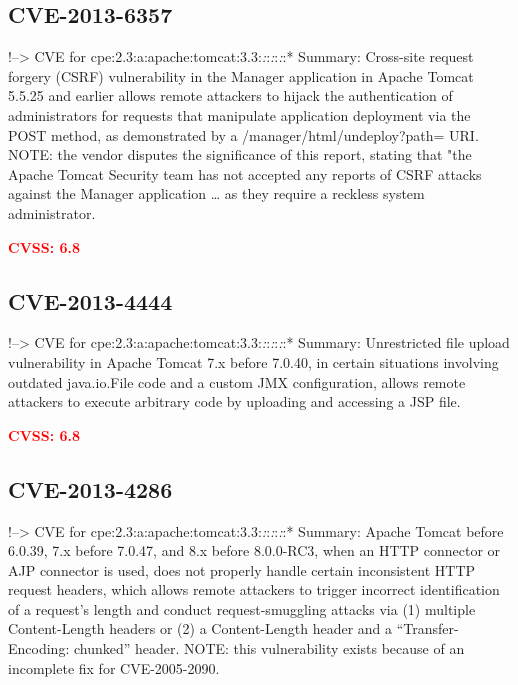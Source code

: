 \documentclass[a4paper, 12pt]{article}
\begin{document}
\hypertarget{cve-2013-6357}{%
\subsection{CVE-2013-6357}\label{cve-2013-6357}}

!--\textgreater{} CVE for
cpe:2.3:a:apache:tomcat:3.3:\emph{:}:\emph{:}:\emph{:}:* Summary:
Cross-site request forgery (CSRF) vulnerability in the Manager
application in Apache Tomcat 5.5.25 and earlier allows remote attackers
to hijack the authentication of administrators for requests that
manipulate application deployment via the POST method, as demonstrated
by a /manager/html/undeploy?path= URI. NOTE: the vendor disputes the
significance of this report, stating that "the Apache Tomcat Security
team has not accepted any reports of CSRF attacks against the Manager
application \ldots{} as they require a reckless system administrator.

\textbf{\textcolor{red}{CVSS: 6.8}}

\hypertarget{cve-2013-4444}{%
\subsection{CVE-2013-4444}\label{cve-2013-4444}}

!--\textgreater{} CVE for
cpe:2.3:a:apache:tomcat:3.3:\emph{:}:\emph{:}:\emph{:}:* Summary:
Unrestricted file upload vulnerability in Apache Tomcat 7.x before
7.0.40, in certain situations involving outdated java.io.File code and a
custom JMX configuration, allows remote attackers to execute arbitrary
code by uploading and accessing a JSP file.

\textbf{\textcolor{red}{CVSS: 6.8}}

\hypertarget{cve-2013-4286}{%
\subsection{CVE-2013-4286}\label{cve-2013-4286}}

!--\textgreater{} CVE for
cpe:2.3:a:apache:tomcat:3.3:\emph{:}:\emph{:}:\emph{:}:* Summary: Apache
Tomcat before 6.0.39, 7.x before 7.0.47, and 8.x before 8.0.0-RC3, when
an HTTP connector or AJP connector is used, does not properly handle
certain inconsistent HTTP request headers, which allows remote attackers
to trigger incorrect identification of a request's length and conduct
request-smuggling attacks via (1) multiple Content-Length headers or (2)
a Content-Length header and a ``Transfer-Encoding: chunked'' header.
NOTE: this vulnerability exists because of an incomplete fix for
CVE-2005-2090.
\end{document}
